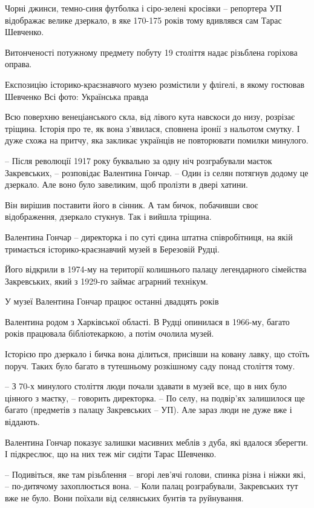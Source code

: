 Чорні джинси, темно-синя футболка і сіро-зелені кросівки – репортера УП
відображає велике дзеркало, в яке 170-175 років тому вдивлявся сам Тарас
Шевченко.

Витонченості потужному предмету побуту 19 століття надає різьблена горіхова
оправа.

Експозицію історико-краєзнавчого музею розмістили у флігелі, в якому гостював
Шевченко Всі фото: Українська правда

Всю поверхню венеціанського скла, від лівого кута навскоси до низу, розрізає
тріщина. Історія про те, як вона з'явилася, сповнена іронії з нальотом смутку.
І дуже схожа на притчу, яка закликає українців не повторювати помилки минулого.

– Після революції 1917 року буквально за одну ніч розграбували маєток
Закревських, – розповідає Валентина Гончар. – Один із селян потягнув додому це
дзеркало. Але воно було завеликим, щоб пролізти в двері хатини.

Він вирішив поставити його в сінник. А там бичок, побачивши своє відображення,
дзеркало стукнув. Так і вийшла тріщина.

Валентина Гончар – директорка і по суті єдина штатна співробітниця, на якій
тримається історико-краєзнавчий музей в Березовій Рудці. 

Його відкрили в 1974-му на території колишнього палацу легендарного сімейства
Закревських, який з 1929-го займає аграрний технікум.

У музеї Валентина Гончар працює останні двадцять років

Валентина родом з Харківської області. В Рудці опинилася в 1966-му, багато
років працювала бібліотекаркою, а потім очолила музей.

Історією про дзеркало і бичка вона ділиться, присівши на ковану лавку, що
стоїть поруч. Таких було багато в тутешньому розкішному саду понад століття
тому.

– З 70-х минулого століття люди почали здавати в музей все, що в них було
цінного з маєтку, – говорить директорка. – По селу, на подвір’ях залишилося ще
багато (предметів з палацу Закревських – УП). Але зараз люди не дуже вже і
віддають.

Валентина Гончар показує залишки масивних меблів з дуба, які вдалося зберегти.
І підкреслює, що на них теж міг сидіти Тарас Шевченко.

– Подивіться, яке там різьблення – вгорі лев'ячі голови, спинка різна і ніжки
які, – по-дитячому захоплюється вона. – Коли палац розграбували, Закревських
тут вже не було. Вони поїхали від селянських бунтів та руйнування.

